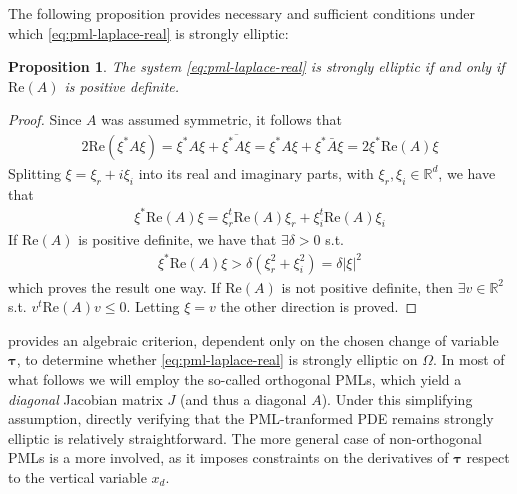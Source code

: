 \documentclass[11pt]{article}
\newcommand{\R}{\mathbb{R}}
\newcommand{\btau}{\mathbf{\tau}}
\newtheorem{proposition}[theorem]{Proposition}
\begin{document}
The following proposition provides necessary and sufficient conditions under
which \cref{eq:pml-laplace-real} is strongly elliptic:
%
\begin{proposition}
  \label{pr:algebraic-condition-strongly-elliptic}
  The system \cref{eq:pml-laplace-real} is strongly elliptic if and only if
  $\mathrm{Re}(A)$ is positive definite.
\end{proposition}
\begin{proof}
  Since $A$ was assumed symmetric, it follows that
  \begin{align}
  2 \mathrm{Re}(\xi^* A \xi) = \xi^* A \xi + \overline{\xi^* A \xi}= \xi^* A \xi + \xi^* \bar{A} \xi = 2 \xi^* \mathrm{Re}(A) \xi
  \end{align}
  Splitting $\xi = \xi_r + i\xi_i$ into its real and imaginary parts, with
  $\xi_r,\xi_i \in \R^d$, we have that
  \begin{align}
  \xi^* \mathrm{Re}(A) \xi = \xi_r^t \mathrm{Re}(A) \xi_r + \xi_i^t \mathrm{Re}(A) \xi_i
  \end{align}
  If $\mathrm{Re}(A)$ is positive definite, we have that $\exists \delta > 0$ s.t.
  \begin{align}
  \xi^* \mathrm{Re}(A) \xi > \delta (\xi_r^2 + \xi_i^2) = \delta |\xi|^2
  \end{align}
  which proves the result one way. If $\mathrm{Re}(A)$ is not positive definite,
  then $\exists v \in \R^2$ s.t. $v^t \mathrm{Re}(A) v \leq 0$. Letting $\xi = v$
  the other direction is proved.
\end{proof}

 provides an algebraic criterion,
dependent only on the chosen change of variable $\btau$, to determine whether
\cref{eq:pml-laplace-real} is strongly elliptic on $\Omega$. In most of what
follows we will employ the so-called orthogonal PMLs, which yield a
\emph{diagonal} Jacobian matrix $J$ (and thus a diagonal $A$). Under this
simplifying assumption, directly verifying that the PML-tranformed PDE remains
strongly elliptic is relatively straightforward. The more general case of
non-orthogonal PMLs is a more involved, as it imposes constraints on the
derivatives of $\btau$ respect to the vertical variable $x_d$. 
\end{document}
